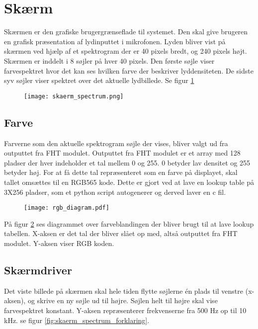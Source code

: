 %

%

\section{Skærm}
Skærmen er den grafiske brugergrænseflade til systemet. Den skal give brugeren en grafisk præsentation af lydinputtet i mikrofonen. Lyden bliver vist på skærmen ved hjælp af et spektrogram der er 40 pixels bredt, og 240 pixels højt.
Skærmen er inddelt i 8 søjler på hver 40 pixels. Den første søjle viser farvespektret hvor det kan ses hvilken farve der beskriver lyddensiteten. De sidste syv søjler viser spektret over det aktuelle lydbillede. Se figur \ref{fig:skaerm_spectrum}

\begin{figure} [H]
	\centering
	\texttt{[image: skaerm\_spectrum.png]}
	\label{fig:skaerm_spectrum}
\end{figure}

\subsection{Farve}
Farverne som den aktuelle spektrogram søjle der vises, bliver valgt ud fra outputtet fra FHT modulet. Outputtet fra FHT modulet er et array med 128 pladser der hver indeholder et tal mellem 0 og 255. 0 betyder lav densitet og 255 betyder høj.
For at få dette tal repræsenteret som en farve på displayet, skal tallet omsættes til en RGB565 kode.
Dette er gjort ved at lave en lookup table på 3X256 pladser, som et python script autogenerer og derved laver en c fil.

\begin{figure} [H]
	\centering
	\texttt{[image: rgb\_diagram.pdf]}
	\label{fig:rgb_diagram}
\end{figure}


På figur \ref{fig:rgb_diagram} ses diagrammet over farveblandingen der bliver brugt til at lave lookup tabellen. X-aksen er det tal der bliver slået op med, altså outputtet fra FHT modulet. Y-aksen viser RGB koden.


\subsection{Skærmdriver}
Det viste billede på skærmen skal hele tiden flytte søjlerne én plads til venstre (x-aksen), og skrive en ny søjle ud til højre. Søjlen helt til højre skal vise farvespektret konstant.
Y-aksen repræsenterer frekvenserne fra 500 Hz op til 10 kHz. se figur \ref{fig:skaerm_spectrum_forklaring}.

